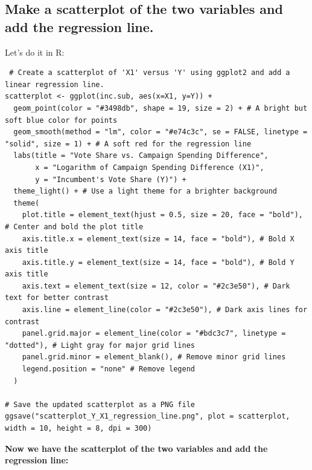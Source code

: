 \documentclass[12pt]{article}
\begin{document}
\subsection{Make a scatterplot of the two variables and add the regression line.}
 Let's do it in R:
\lstset{style=mystyle}
\begin{lstlisting}
 # Create a scatterplot of 'X1' versus 'Y' using ggplot2 and add a linear regression line.
scatterplot <- ggplot(inc.sub, aes(x=X1, y=Y)) +
  geom_point(color = "#3498db", shape = 19, size = 2) + # A bright but soft blue color for points
  geom_smooth(method = "lm", color = "#e74c3c", se = FALSE, linetype = "solid", size = 1) + # A soft red for the regression line
  labs(title = "Vote Share vs. Campaign Spending Difference",
       x = "Logarithm of Campaign Spending Difference (X1)",
       y = "Incumbent's Vote Share (Y)") +
  theme_light() + # Use a light theme for a brighter background
  theme(
    plot.title = element_text(hjust = 0.5, size = 20, face = "bold"), # Center and bold the plot title
    axis.title.x = element_text(size = 14, face = "bold"), # Bold X axis title
    axis.title.y = element_text(size = 14, face = "bold"), # Bold Y axis title
    axis.text = element_text(size = 12, color = "#2c3e50"), # Dark text for better contrast
    axis.line = element_line(color = "#2c3e50"), # Dark axis lines for contrast
    panel.grid.major = element_line(color = "#bdc3c7", linetype = "dotted"), # Light gray for major grid lines
    panel.grid.minor = element_blank(), # Remove minor grid lines
    legend.position = "none" # Remove legend
  )

# Save the updated scatterplot as a PNG file
ggsave("scatterplot_Y_X1_regression_line.png", plot = scatterplot, width = 10, height = 8, dpi = 300)
\end{lstlisting}
\textbf{Now we have the scatterplot of the two variables and add the regression line:}
\end{document}
